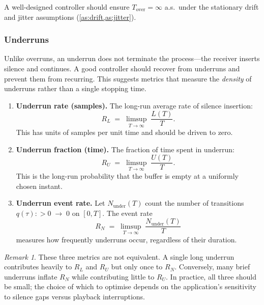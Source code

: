 \documentclass[11pt, a4paper]{article}
\theoremstyle{definition}
\theoremstyle{plain}
\theoremstyle{remark}
\newtheorem{remark}{Remark}[section]
\begin{document}
A well-designed controller should ensure
$T_{\text{over}} = \infty$ a.s.\ under the stationary drift
and jitter assumptions
(\cref{as:drift,as:jitter}).

\subsubsection{Underruns}

Unlike overruns, an underrun does not terminate the process---the
receiver inserts silence and continues.  A good controller should
recover from underruns and prevent them from recurring.  This
suggests metrics that measure the \emph{density} of underruns rather
than a single stopping time.

\begin{enumerate}[label=(U\arabic*)]
  \item \textbf{Underrun rate (samples).}\;
    The long-run average rate of silence insertion:
    \begin{equation}\label{eq:underrun-rate}
      R_L \;=\; \limsup_{T \to \infty}\;
        \frac{L(T)}{T}.
    \end{equation}
    This has units of samples per unit time and should be driven
    to zero.

  \item \textbf{Underrun fraction (time).}\;
    The fraction of time spent in underrun:
    \begin{equation}\label{eq:underrun-fraction}
      R_U \;=\; \limsup_{T \to \infty}\;
        \frac{U(T)}{T}.
    \end{equation}
    This is the long-run probability that the buffer is empty at a
    uniformly chosen instant.

  \item \textbf{Underrun event rate.}\;
    Let $N_{\text{under}}(T)$ count the number of transitions
    $q(\tau) : {>}0 \;\to\; 0$ on $[0, T]$.  The event rate
    \begin{equation}\label{eq:underrun-event-rate}
      R_N \;=\; \limsup_{T \to \infty}\;
        \frac{N_{\text{under}}(T)}{T}
    \end{equation}
    measures how frequently underruns occur, regardless of their
    duration.
\end{enumerate}

\begin{remark}
  These three metrics are not equivalent.  A single long underrun
  contributes heavily to $R_L$ and $R_U$ but only once to $R_N$.
  Conversely, many brief underruns inflate $R_N$ while contributing
  little to $R_U$.  In practice, all three should be small; the
  choice of which to optimise depends on the application's
  sensitivity to silence gaps versus playback interruptions.
\end{remark}
\end{document}
